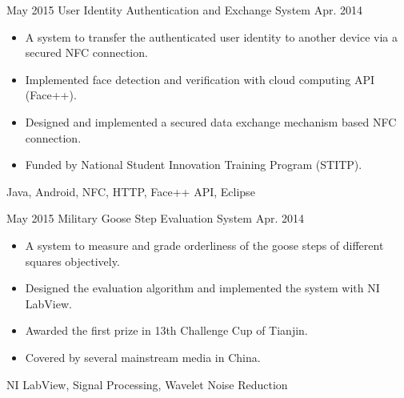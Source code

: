 \begin{projects}
\project
  {May 2015}		{User Identity Authentication and Exchange System}
  {Apr. 2014}		{\begin{itemize}
  						\item A system to transfer the authenticated user identity to another device via a secured NFC connection.
						\item Implemented face detection and verification with cloud computing API (Face++).
                        \item Designed and implemented a secured data exchange mechanism based NFC connection.
  						\item Funded by National Student Innovation Training Program (STITP). 
  					\end{itemize} 
                    }
                    {Java, Android, NFC, HTTP, Face++ API, Eclipse}
\emptySeparator

\project
  {May 2015}		{Military Goose Step Evaluation System}
  {Apr. 2014}		{\begin{itemize}
  						\item A system to measure and grade orderliness of the goose steps of different squares objectively. 
						\item Designed the evaluation algorithm and implemented the system with NI LabView.
                        \item Awarded the first prize in 13th Challenge Cup of Tianjin.
                        \item Covered by several mainstream media in China.
  					\end{itemize} 
                    }
                    {NI LabView, Signal Processing, Wavelet Noise Reduction}


\end{projects}

